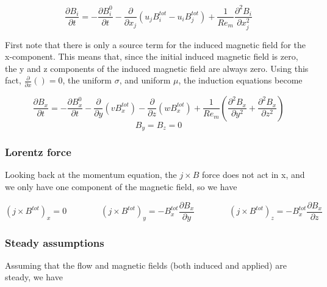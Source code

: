 \documentclass[11pt]{article}
\begin{document}
\begin{equation}
	\frac{\partial B_i}{\partial t} 
	=
	- \frac{\partial B_i^0}{\partial t} 
	- \frac{\partial}{\partial x_j} (u_j B_i^{tot} - u_i B_j^{tot}) 
	+
	\frac{1}{Re_m}
	\frac{\partial^2 B_i}{\partial x_j^2}
\end{equation}

First note that there is only a source term for the induced magnetic field for the x-component. This means that, since the initial induced magnetic field is zero, the y and z components of the induced magnetic field are always zero. Using this fact, $\frac{\partial}{\partial x} ()=0$, the uniform $\sigma$, and uniform $\mu$, the induction equations become


\begin{equation}
	\frac{\partial B_x}{\partial t} 
	=
	- \frac{\partial B_x^0}{\partial t}
	- \frac{\partial}{\partial y} (v B_x^{tot})
	- \frac{\partial}{\partial z} (w B_x^{tot})
	+ \frac{1}{Re_m}
	\left(
	\frac{\partial^2 B_x}{\partial y^2}
	+
	\frac{\partial^2 B_x}{\partial z^2}
	\right)
\end{equation}
\begin{equation}
	B_y = B_z = 0
\end{equation}

\subsubsection{Lorentz force}

Looking back at the momentum equation, the $j\times B$ force does not act in x, and we only have one component of the magnetic field, so we have

\begin{equation}
	(j \times B^{tot})_x = 0
	\qquad \qquad
	(j \times B^{tot})_y = -	B_x^{tot} \frac{\partial B_x}{\partial y} 
	\qquad \qquad
	(j \times B^{tot})_z = - B_x^{tot} \frac{\partial B_x}{\partial z} 
\end{equation}

\subsubsection{Steady assumptions}
Assuming that the flow and magnetic fields (both induced and applied) are steady, we have
\end{document}
